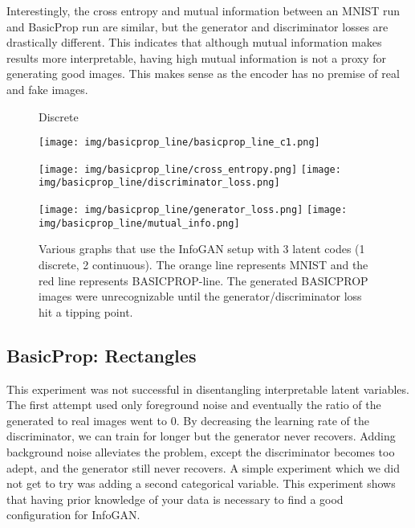 \documentclass{article}
\begin{document}
Interestingly, the cross entropy and mutual information between an MNIST run and BasicProp run are similar, but the generator and discriminator losses are drastically different. This indicates that although mutual information makes results more interpretable, having high mutual information is not a proxy for generating good images. This makes sense as the encoder has no premise of real and fake images.

\begin{figure}[ht]
\begin{center}
\begin{multicols}{3}

Discrete

\texttt{[image: img/basicprop\_line/basicprop\_line\_c1.png]}

\texttt{[image: img/basicprop\_line/cross\_entropy.png]}
\texttt{[image: img/basicprop\_line/discriminator\_loss.png]}

\texttt{[image: img/basicprop\_line/generator\_loss.png]}
\texttt{[image: img/basicprop\_line/mutual\_info.png]}
\end{multicols}

\caption{Various graphs that use the InfoGAN setup with 3 latent codes (1 discrete, 2 continuous). The orange line represents MNIST and the red line represents BASICPROP-line. The generated BASICPROP images were unrecognizable until the generator/discriminator loss hit a tipping point.}

\end{center}
\end{figure}

\subsection{BasicProp: Rectangles}


This experiment was not successful in disentangling interpretable latent variables. The first attempt used only foreground noise and eventually the ratio of the generated to real images went to 0. By decreasing the learning rate of the discriminator, we can train for longer but the generator never recovers. Adding background noise alleviates the problem, except the discriminator becomes too adept, and the generator still never recovers. A simple experiment which we did not get to try was adding a second categorical variable. This experiment shows that having prior knowledge of your data is necessary to find a good configuration for InfoGAN.
\end{document}
